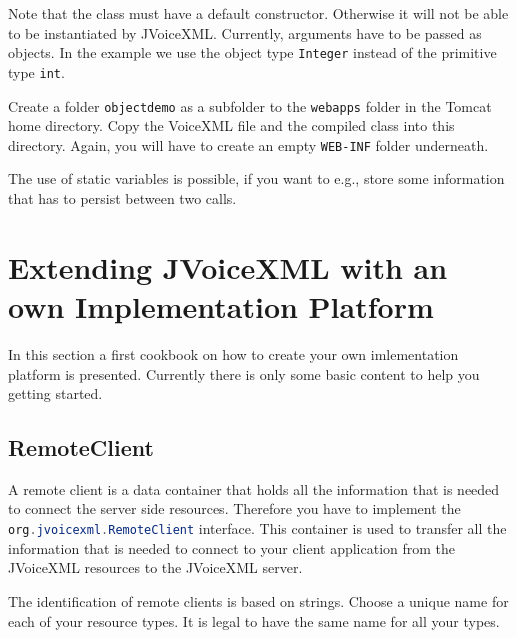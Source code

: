 \documentclass[11pt,a4paper]{book}
\begin{document}
Note that the class must have a default constructor. Otherwise it will not be
able to be instantiated by JVoiceXML. Currently, arguments have to be passed as
objects. In the example we use the object type \lstinline{Integer} instead of
the primitive type \lstinline{int}.

Create a folder \lstinline{objectdemo} as a subfolder to the \lstinline{webapps}
folder in the Tomcat home directory. Copy the VoiceXML file and the compiled
class into this directory. Again, you will have to create an empty
\lstinline{WEB-INF} folder underneath.

The use of static variables is possible, if you want
to e.g., store some information that has to persist between two calls.
\chapter{Extending JVoiceXML with an own Implementation Platform}

In this section a first cookbook on how to create your own imlementation
platform is presented. Currently there is only some basic content to help you
getting started.


\section{RemoteClient}

A remote client is a data container that holds all the information that is
needed to connect the server side resources. Therefore you have to implement
the \lstinline[language=Java]{org.jvoicexml.RemoteClient} interface. This
container is used to transfer all the information that is needed to connect to
your client application from the JVoiceXML resources to the JVoiceXML server.

The identification of remote clients is based on strings. Choose a unique name
for each of your resource types. It is legal to have the same name for all your
types.
\end{document}

